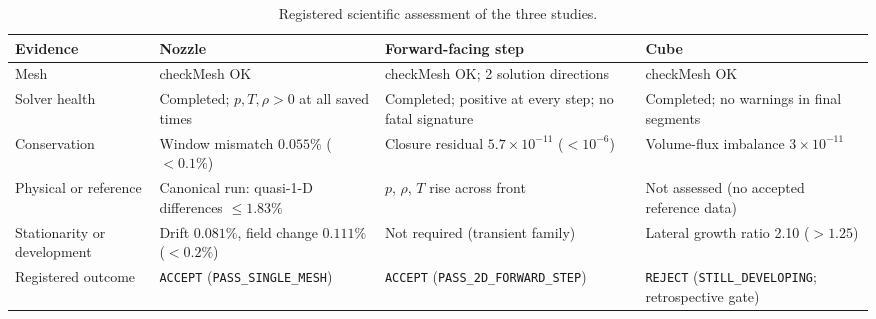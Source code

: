 \documentclass[11pt]{article}
\begin{document}
\begin{table}[!htbp]
\centering
\caption{Registered scientific assessment of the three studies.}
\label{tab:assessment}
\footnotesize
\setlength{\tabcolsep}{4pt}
\begin{tabularx}{\linewidth}{@{}>{\raggedright\arraybackslash}p{2.3cm}
  >{\raggedright\arraybackslash}X >{\raggedright\arraybackslash}X
  >{\raggedright\arraybackslash}X@{}}
\toprule
Evidence & Nozzle & Forward-facing step & Cube \\
\midrule
Mesh & checkMesh OK & checkMesh OK; 2 solution directions & checkMesh OK \\
Solver health & Completed; $p,T,\rho>0$ at all saved times & Completed; positive at every step; no fatal signature & Completed; no warnings in final segments \\
Conservation & Window mismatch $0.055\%$ ($<0.1\%$) & Closure residual $5.7\times10^{-11}$ ($<10^{-6}$) & Volume-flux imbalance $3\times10^{-11}$ \\
Physical or reference & Canonical run: quasi-1-D differences $\le1.83\%$ & $p$, $\rho$, $T$ rise across front & Not assessed (no accepted reference data) \\
Stationarity or development & Drift $0.081\%$, field change $0.111\%$ ($<0.2\%$) & Not required (transient family) & Lateral growth ratio 2.10 ($>1.25$) \\
Registered outcome & \texttt{ACCEPT} \newline (\texttt{PASS\_SINGLE\_MESH}) & \texttt{ACCEPT} \newline (\texttt{PASS\_2D\_FORWARD\_STEP}) & \texttt{REJECT} \newline (\texttt{STILL\_DEVELOPING}; retrospective gate) \\
\bottomrule
\end{tabularx}
\end{table}
\end{document}
